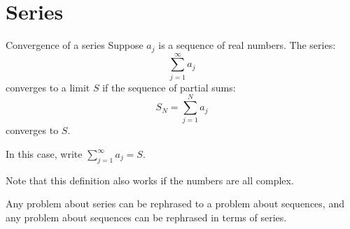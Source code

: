 \documentclass[../Main.tex]{subfiles}
\begin{document}
\section{Series}
\begin{definition}{Convergence of a series}
    Suppose $a_j$ is a sequence of real numbers. The series:
    \begin{equation*}
        \sum_{j=1}^{\infty} a_j
    \end{equation*}
    converges to a limit $S$ if the sequence of partial sums:
    \begin{equation*}
        S_N = \sum_{j=1}^{N} a_j
    \end{equation*}
    converges to $S$.\par
    In this case, write $\sum_{j=1}^\infty a_j = S$.
\end{definition}
Note that this definition also works if the numbers are all complex.
\begin{remark}
    Any problem about series can be rephrased to a problem about sequences, and any problem about sequences can be rephrased in terms of series.
\end{remark}
\end{document}
